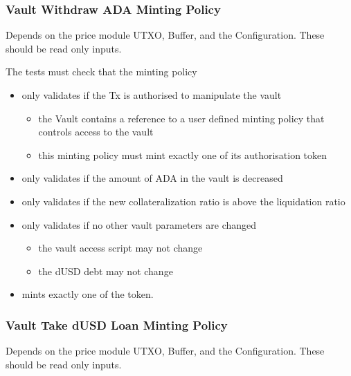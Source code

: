 \documentclass{article} %
\begin{document}
\subsubsection{Vault Withdraw ADA Minting Policy}
Depends on the price module UTXO, Buffer, and the Configuration.
These should be read only inputs.

The tests must check that the minting policy
\begin{itemize}
  \item only validates if the Tx is authorised to manipulate the vault
  \begin{itemize}
    \item the Vault contains a reference to a user defined minting policy that controls access to the vault
    \item this minting policy must mint exactly one of its authorisation token
  \end{itemize}
  \item only validates if the amount of ADA in the vault is decreased
  \item only validates if the new collateralization ratio is above the liquidation ratio
  \item only validates if no other vault parameters are changed
  \begin{itemize}
    \item the vault access script may not change
    \item the dUSD debt may not change
  \end{itemize}
  \item mints exactly one of the token.
\end{itemize}

\subsubsection{Vault Take dUSD Loan Minting Policy}
Depends on the price module UTXO, Buffer, and the Configuration.
These should be read only inputs.
\end{document}
